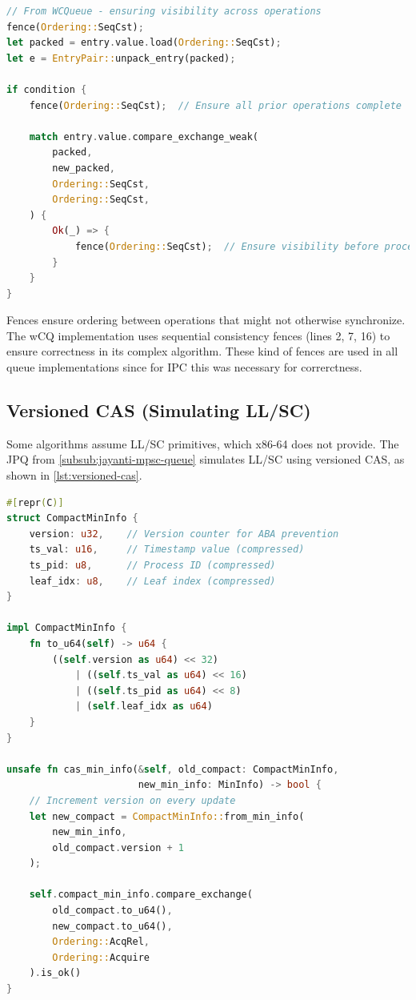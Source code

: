 \begin{lstlisting}[language=Rust, style=boxed, caption={Explicit memory fence usage}, label={lst:memory-fences}]
// From WCQueue - ensuring visibility across operations
fence(Ordering::SeqCst);
let packed = entry.value.load(Ordering::SeqCst);
let e = EntryPair::unpack_entry(packed);

if condition {
    fence(Ordering::SeqCst);  // Ensure all prior operations complete
    
    match entry.value.compare_exchange_weak(
        packed,
        new_packed,
        Ordering::SeqCst,
        Ordering::SeqCst,
    ) {
        Ok(_) => {
            fence(Ordering::SeqCst);  // Ensure visibility before proceeding
        }
    }
}
\end{lstlisting}

Fences ensure ordering between operations that might not otherwise synchronize. The \ac{wCQ} implementation uses sequential consistency fences (lines 2, 7, 16) to ensure correctness in its complex algorithm. These kind of fences are used in all queue implementations since for \ac{IPC} this was necessary for correrctness. 

\subsection{Versioned \acf{CAS} (Simulating \acf{LL/SC})}

Some algorithms assume \ac{LL/SC} primitives, which x86-64 does not provide. The \ac{JPQ} from \cref{subsub:jayanti-mpsc-queue} simulates \ac{LL/SC} using versioned \ac{CAS}, as shown in \cref{lst:versioned-cas}.

\begin{lstlisting}[language=Rust, style=boxed, caption={Versioned CAS for LL/SC simulation}, label={lst:versioned-cas}]
#[repr(C)]
struct CompactMinInfo {
    version: u32,    // Version counter for ABA prevention
    ts_val: u16,     // Timestamp value (compressed)
    ts_pid: u8,      // Process ID (compressed)  
    leaf_idx: u8,    // Leaf index (compressed)
}

impl CompactMinInfo {
    fn to_u64(self) -> u64 {
        ((self.version as u64) << 32)
            | ((self.ts_val as u64) << 16)
            | ((self.ts_pid as u64) << 8)
            | (self.leaf_idx as u64)
    }
}

unsafe fn cas_min_info(&self, old_compact: CompactMinInfo, 
                       new_min_info: MinInfo) -> bool {
    // Increment version on every update
    let new_compact = CompactMinInfo::from_min_info(
        new_min_info, 
        old_compact.version + 1
    );
    
    self.compact_min_info.compare_exchange(
        old_compact.to_u64(),
        new_compact.to_u64(),
        Ordering::AcqRel,
        Ordering::Acquire
    ).is_ok()
}
\end{lstlisting}

